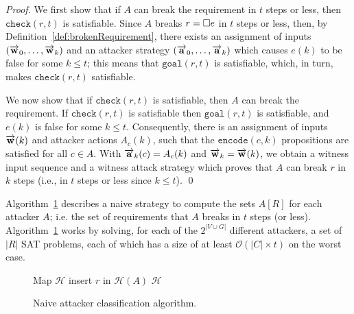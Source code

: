 {\begin{proof}
We first show that if $A$ can break the requirement in $t$ steps or less, then $\mathtt{check}(r,t)$ is satisfiable. Since $A$ breaks $r={{\square}} e$ in $t$ steps or less, then, by Definition~\ref{def:brokenRequirement}, there exists an assignment of inputs $(\overrightarrow{\bf{w}}_0, \ldots, \overrightarrow{\bf{w}}_k)$ and an attacker strategy $(\overrightarrow{\bf{a}}_0, \ldots, \overrightarrow{\bf{a}}_k)$ which causes $e(k)$ to be false for some $k\leq t$; this means that $\mathtt{goal}(r,t)$ is satisfiable, which, in turn, makes $\mathtt{check}(r,t)$ satisfiable.

We now show that if $\mathtt{check}(r,t)$ is satisfiable, then $A$ can break the requirement. If $\mathtt{check}(r,t)$ is satisfiable then $\mathtt{goal}(r,t)$ is satisfiable, and $e(k)$ is false for some $k\leq t$. Consequently, there is an assignment of inputs $\overrightarrow{\bf{w}}(k)$ and attacker actions $A_c(k)$, such that the $\mathtt{encode}(c,k)$ propositions are satisfied for all $c\in A$. With $\overrightarrow{\bf{a}}_k(c)=A_c(k)$ and $\overrightarrow{\bf{w}}_k =\overrightarrow{\bf{w}}(k)$, we obtain a witness input sequence and a witness attack strategy which proves that $A$ can break $r$ in $k$ steps (i.e., in $t$ steps or less since $k\leq t$).
\qed
\end{proof}

Algorithm~\ref{alg:BadQuantification} describes a naive strategy to compute the sets $A[R]$ for each attacker $A$; i.e. the set of requirements that $A$ breaks in $t$ steps (or less). Algorithm~\ref{alg:BadQuantification} works by solving, for each of the $2^{|V \cup G|}$ different attackers, a set of $|R|$ SAT problems, 
{
each of which has a size of at least $\mathcal{O}\left({|C|\times t}\right)$ on the worst case.}

\begin{figure}[!t]
\centering
{
\begin{framed}
\begin{algorithm}[H]
Map $\mathcal{H}$\;
{
	{
		{
			insert $r$ in $\mathcal{H}(A)$\;
		}
	 }
}
 \Return $\mathcal{H}$\;
 \caption{Naive attacker classification algorithm.}
 \label{alg:BadQuantification}
\end{algorithm}
\end{framed}
}
\end{figure}

}
